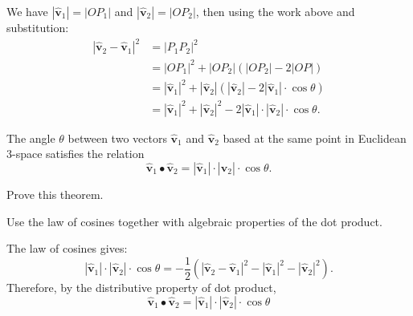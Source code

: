 \documentclass[newpage,hints,handout]{ximera}
\begin{document}
\begin{problem}
\begin{enumerate}
\begin{freeResponse}
  We have $|\hat{\mathbf v}_{1}|=|OP_{1}|$ and $|\hat{\mathbf v}_{2}|=|OP_{2}|$,
  then using the work above and substitution:
  \begin{align*} 
    |\hat{\mathbf v}_{2} - \hat{\mathbf v}_{1}|^2 &= |P_{1}P_{2}|^{2}\\
    &=|OP_{1}|^{2}+|OP_{2}| \left(|OP_{2}| -2| OP| \right)\\
    &=|\hat{\mathbf v}_{1}|^2 + |\hat{\mathbf v}_{2}|
    \left(|\hat{\mathbf v}_{2}|-2|\hat{\mathbf v}_{1}| \cdot\cos\theta \right) \\
    &=|\hat{\mathbf v}_{1}|^2 +|\hat{\mathbf v}_{2}|^2
    -2|\hat{\mathbf v}_{1}| \cdot |\hat{\mathbf v}_{2}| \cdot\cos\theta.
\end{align*}
\end{freeResponse}

\end{enumerate}
\end{problem}




\begin{theorem}
\label{111}The angle $\theta$ between two vectors $\hat{\mathbf v}_{1}$ and
$\hat{\mathbf v}_{2}$ based at the same point in Euclidean $3$-space
satisfies the relation
\begin{equation}
  \hat{\mathbf v}_{1}\bullet\hat{\mathbf v}_{2}
  =\left\vert \hat{\mathbf v}_{1}\right\vert \cdot
  \left\vert \hat{\mathbf v}_{2}\right\vert \cdot\cos\theta. \label{2}%
\end{equation}
\end{theorem}


\begin{problem}
  Prove this theorem.
  \begin{hint}
    Use the law of cosines together with algebraic properties of the dot
    product.
  \end{hint}
\begin{freeResponse}
The law of cosines gives:
\[
|\hat{\mathbf v}_{1}|\cdot|\hat{\mathbf v}_{2}|\cdot\cos\theta
= -\frac{1}{2}\left(|\hat{\mathbf v}_{2}-\hat{\mathbf v}_{1}|^2 -|\hat{\mathbf v}_{1}|^2 - |\hat{\mathbf v}_{2}|^2\right).
\]
Therefore, by the distributive property of dot product,
\[
\hat{\mathbf v}_{1}\bullet\hat{\mathbf v}_{2} = |\hat{\mathbf v}_{1}|\cdot|\hat{\mathbf v}_{2}|\cdot\cos\theta
\]
\end{freeResponse} 
\end{problem}
\end{document}
